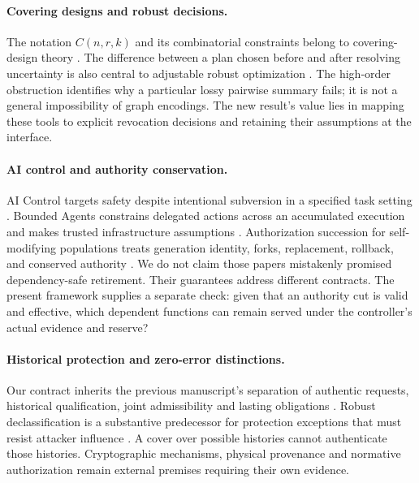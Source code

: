 \documentclass[11pt,a4paper]{article}
\theoremstyle{definition}\newtheorem{definition}{Definition}
\begin{document}
\paragraph{Covering designs and robust decisions.}
The notation $C(n,r,k)$ and its combinatorial constraints belong to covering-design theory \cite{bailey}. The difference between a plan chosen before and after resolving uncertainty is also central to adjustable robust optimization \cite{bental}. The high-order obstruction identifies why a particular lossy pairwise summary fails; it is not a general impossibility of graph encodings. The new result's value lies in mapping these tools to explicit revocation decisions and retaining their assumptions at the interface.

\paragraph{AI control and authority conservation.}
AI Control targets safety despite intentional subversion in a specified task setting \cite{greenblatt}. Bounded Agents constrains delegated actions across an accumulated execution and makes trusted infrastructure assumptions \cite{muruaga}. Authorization succession for self-modifying populations treats generation identity, forks, replacement, rollback, and conserved authority \cite{zhu}. We do not claim those papers mistakenly promised dependency-safe retirement. Their guarantees address different contracts. The present framework supplies a separate check: given that an authority cut is valid and effective, which dependent functions can remain served under the controller's actual evidence and reserve?

\paragraph{Historical protection and zero-error distinctions.}
Our contract inherits the previous manuscript's separation of authentic requests, historical qualification, joint admissibility and lasting obligations \cite{liu3}. Robust declassification is a substantive predecessor for protection exceptions that must resist attacker influence \cite{myers}. A cover over possible histories cannot authenticate those histories. Cryptographic mechanisms, physical provenance and normative authorization remain external premises requiring their own evidence.
\end{document}
